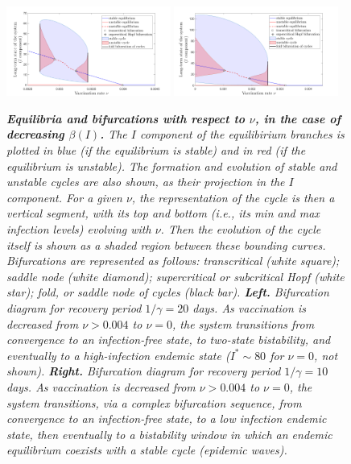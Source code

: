 \documentclass[10pt]{article}
\begin{document}
\begin{figure}[h!]
\begin{center}
\includegraphics[width=0.48\textwidth]{figures/N_increasing_beta_20.png}
\includegraphics[width=0.48\textwidth]{figures/N_increasing_beta_10.png}
\caption{\emph{{\bf Equilibria and bifurcations with respect to $\nu$, in the case of decreasing $\beta(I)$.} The $I$ component of the equilibirium branches is plotted in blue (if the equilibrium is stable) and in red (if the equilibrium is unstable). The formation and evolution of stable and unstable cycles are also shown, as their projection in the $I$ component. For a given $\nu$, the representation of the cycle is then a vertical segment, with its top and bottom (i.e., its min and max infection levels) evolving with $\nu$. Then the evolution of the cycle itself is shown as a shaded region between these bounding curves. Bifurcations are represented as follows: transcritical (white square); saddle node (white diamond); supercritical or subcritical Hopf (white star); fold, or saddle node of cycles (black bar). {\bf Left.} Bifurcation diagram for recovery period $1/\gamma = 20$ days. As vaccination is decreased from $\nu>0.004$ to $\nu=0$, the system transitions from convergence to an infection-free state, to two-state bistability, and eventually to a high-infection endemic state ($I^*\sim 80$ for $\nu=0$, not shown). {\bf Right.} Bifurcation diagram for recovery period $1/\gamma = 10$ days. As vaccination is decreased from $\nu>0.004$ to $\nu=0$, the system transitions, via a complex bifurcation sequence, from convergence to an infection-free state, to a low infection endemic state, then eventually to a bistability window in which an endemic equilibrium coexists with a stable cycle (epidemic waves).}}
\label{increasing_beta}
\end{center}
\end{figure}
\end{document}

